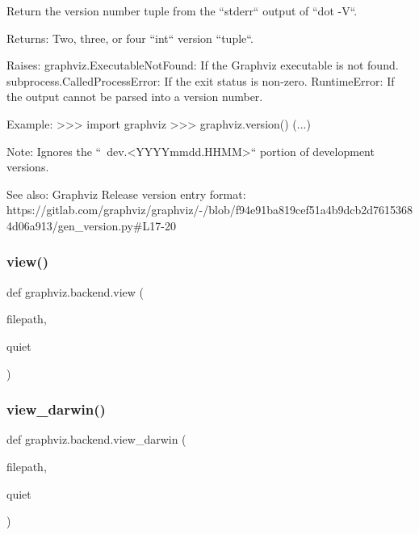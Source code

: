 \begin{DoxyVerb}Return the version number tuple from the ``stderr`` output of ``dot -V``.

Returns:
    Two, three, or four ``int`` version ``tuple``.

Raises:
    graphviz.ExecutableNotFound: If the Graphviz executable is not found.
    subprocess.CalledProcessError: If the exit status is non-zero.
    RuntimeError: If the output cannot be parsed into a version number.

Example:
    >>> import graphviz
    >>> graphviz.version()
    (...)

Note:
    Ignores the ``~dev.<YYYYmmdd.HHMM>`` portion of development versions.

See also:
    Graphviz Release version entry format:
    https://gitlab.com/graphviz/graphviz/-/blob/f94e91ba819cef51a4b9dcb2d76153684d06a913/gen_version.py#L17-20
\end{DoxyVerb}
 \mbox{\label{namespacegraphviz_1_1backend_a72d0d5c4b883d45119cd0044f18adbb1}} 
\subsubsection{\texorpdfstring{view()}{view()}}
{\footnotesize\ttfamily def graphviz.\+backend.\+view (\begin{DoxyParamCaption}\item[{}]{filepath,  }\item[{}]{quiet }\end{DoxyParamCaption})}

\mbox{\label{namespacegraphviz_1_1backend_a498c99db93eb0697bdcace197fb8c429}} 
\subsubsection{\texorpdfstring{view\+\_\+darwin()}{view\_darwin()}}
{\footnotesize\ttfamily def graphviz.\+backend.\+view\+\_\+darwin (\begin{DoxyParamCaption}\item[{}]{filepath,  }\item[{}]{quiet }\end{DoxyParamCaption})}

